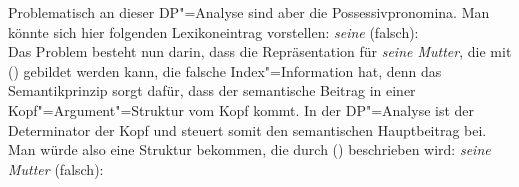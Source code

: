 Problematisch an dieser DP"=Analyse sind aber die Possessivpronomina. Man könnte sich
hier folgenden Lexikoneintrag vorstellen:
\eas
\textit{seine} (falsch):\\
\zs
Das Problem besteht nun darin, dass die Repräsentation für \emph{seine Mutter},
die mit () gebildet werden kann, die falsche Index"=Information hat, denn das Semantikprinzip
sorgt dafür, dass der semantische Beitrag in einer Kopf"=Argument"=Struktur vom Kopf kommt. In der
DP"=Analyse ist der Determinator der Kopf und steuert somit den semantischen Hauptbeitrag bei. Man
würde also eine Struktur bekommen, die durch () beschrieben wird:
\eas
\textit{seine Mutter} (falsch):\\
